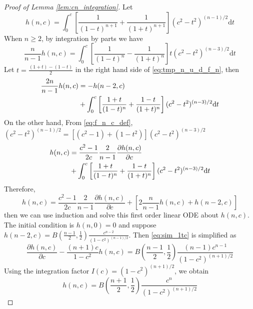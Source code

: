 \documentclass[conference,a4paper]{IEEEtran}
\def\d{\mathrm{d}}
\begin{document}
\begin{proof}[Proof of Lemma \ref{lem:cn_integration}]
     Let
\begin{equation}\label{eq:f_n_c_def}
h(n,c)=   \int_0^{c}
    [\frac{1}{(1-t)^{n+1}}+\frac{1}{(1+t)^{n+1}}]
    (c^2- t^2)^{(n-1)/2}\d t
\end{equation}
When $n\geq 2$, by integration by parts 
we have 
\begin{equation}\label{eq:tmp_n_u_d_f_n}
    \frac{n}{n-1}h(n,c)
    =\int_0^{c}
    \left[\frac{1}{(1-t)^{n}}
    -\frac{1}{(1+t)^{n}}
    \right]
    t(c^2- t^2)^{(n-3)/2}
    \d t
\end{equation}
Let $t=\frac{(1+t)-(1-t)}{2}$ in the right hand side
of \eqref{eq:tmp_n_u_d_f_n}, then
\begin{align}
    \frac{2n}{n-1}h(n,c)
&=    -h(n-2,c)  
\notag\\
&+ \int_0^{c}
\left[\frac{1+t}{(1-t)^{n}}
+\frac{1-t}{(1+t)^{n}}
\right]
(c^2- t^2)^{(n-3)/2}
\d t
\end{align}
On the other hand,
From \eqref{eq:f_n_c_def},
$(c^2-t^2)^{(n-1)/2}
=[(c^2-1)+(1-t^2)](c^2-t^2)^{(n-3)/2}$
\begin{align}
    h(n, c) &= \frac{c^2-1}{2c}\frac{2}{n-1}\frac{\partial h(n,c)}{\partial c}\notag\\
    &+  \int_0^{c}
    \left[\frac{1+t}{(1-t)^{n}}
    +\frac{1-t}{(1+t)^{n}}
    \right]
    (c^2- t^2)^{(n-3)/2}
    \d t
\end{align}
Therefore,
\begin{equation}\label{eq:sim_1tc}
    h(n,c)=\frac{c^2-1}{2c}\frac{2}{n-1}\frac{\partial h(n,c)}{\partial c}
    + [2\frac{n}{n-1} h(n,c) + h(n-2, c)]
\end{equation}
then we can use induction and solve this
first order linear ODE about $h(n,c)$.
The initial condition is $h(n,0)=0$ and
suppose
$h(n-2,c)=B(\frac{n-1}{2}, \frac{1}{2})
\frac{c^{n-2}}{(1-c^2)^{(n-1)/2}}$.
Then \eqref{eq:sim_1tc} is simplified as
\begin{equation}
    \frac{\partial h(n,c)}{\partial c}
    - \frac{(n+1)c}{1-c^2} h(n,c)
    = B(\frac{n-1}{2}, \frac{1}{2})\frac{(n-1)c^{n-1}}{(1-c^2)^{(n+1)/2}}
\end{equation}
Using the integration factor $I(c)=(1-c^2)^{(n+1)/2}$, we obtain
\begin{equation}\label{eq:f_n_c_expression}
    h(n,c)= B(\frac{n+1}{2}, \frac{1}{2})
    \frac{c^n}{(1-c^2)^{(n+1)/2}}
\end{equation}

\end{proof}
\end{document}
